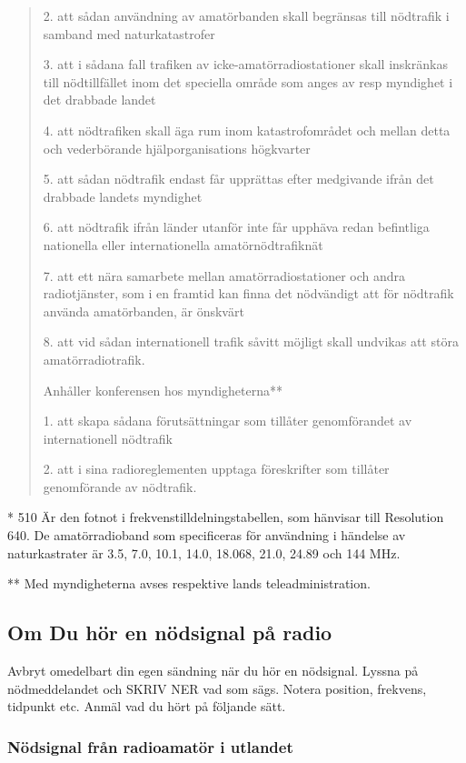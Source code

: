 \begin{rev-omarbetas}
\begin{quote}
2. att sådan användning av amatörbanden skall begränsas till nödtrafik i samband
med naturkatastrofer

3. att i sådana fall trafiken av icke-amatörradiostationer skall inskränkas till
nödtillfället inom det speciella område som anges av resp myndighet i det
drabbade landet

4. att nödtrafiken skall äga rum inom katastrofområdet och mellan detta och
vederbörande hjälporganisations högkvarter

5. att sådan nödtrafik endast får upprättas efter medgivande ifrån det drabbade
landets myndighet

6. att nödtrafik ifrån länder utanför inte får upphäva redan befintliga
nationella eller internationella amatörnödtrafiknät

7. att ett nära samarbete mellan amatörradiostationer och andra radiotjänster,
som i en framtid kan finna det nödvändigt att för nödtrafik använda
amatörbanden, är önskvärt

8. att vid sådan internationell trafik såvitt möjligt skall undvikas att störa
amatörradiotrafik.

Anhåller konferensen hos myndigheterna**

1. att skapa sådana förutsättningar som tillåter genomförandet av internationell
nödtrafik

2. att i sina radioreglementen upptaga föreskrifter som tillåter genomförande av
nödtrafik.
\end{quote}

* 510 Är den fotnot i frekvenstilldelningstabellen, som hänvisar till
Resolution 640. De amatörradioband som specificeras för användning i
händelse av naturkastrater är 3.5, 7.0, 10.1, 14.0, 18.068, 21.0,
24.89 och 144 MHz.

** Med myndigheterna avses respektive lands teleadministration.
\end{rev-omarbetas}

\subsection{Om Du hör en nödsignal på radio}

Avbryt omedelbart din egen sändning när du hör en nödsignal. Lyssna på
nödmeddelandet och SKRIV NER vad som sägs. Notera position, frekvens, tidpunkt
etc. Anmäl vad du hört på följande sätt.

\subsubsection{Nödsignal från radioamatör i utlandet}


